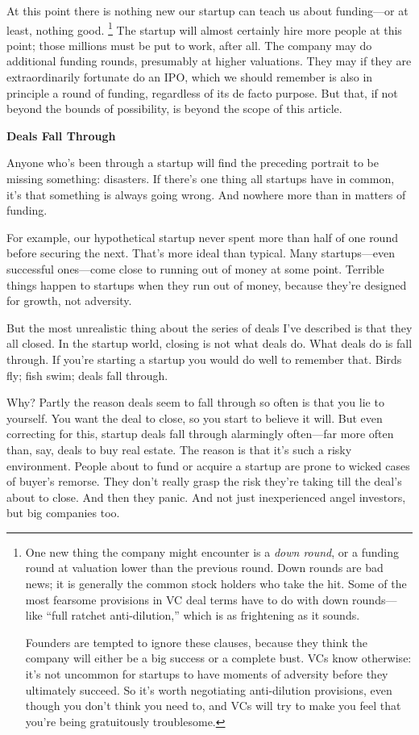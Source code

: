 At this point there is nothing new our startup can teach us about
funding---or at least, nothing good. \footnote{One new thing the company might encounter is a \emph{down
round}, or a funding round at valuation lower than the previous round.
Down rounds are bad news; it is generally the common stock holders who
take the hit. Some of the most fearsome provisions in VC deal terms have
to do with down rounds---like ``full ratchet anti-dilution,'' which is
as frightening as it sounds.

Founders are tempted to ignore these clauses, because they think the
company will either be a big success or a complete bust. VCs know
otherwise: it's not uncommon for startups to have moments of adversity
before they ultimately succeed. So it's worth negotiating anti-dilution
provisions, even though you don't think you need to, and VCs will try to
make you feel that you're being gratuitously troublesome.} The
startup will almost certainly hire more people at this point; those
millions must be put to work, after all. The company may do additional
funding rounds, presumably at higher valuations. They may if they are
extraordinarily fortunate do an IPO, which we should remember is also in
principle a round of funding, regardless of its de facto purpose. But
that, if not beyond the bounds of possibility, is beyond the scope of
this article.

\textbf{Deals Fall Through}

Anyone who's been through a startup will find the preceding portrait to
be missing something: disasters. If there's one thing all startups have
in common, it's that something is always going wrong. And nowhere more
than in matters of funding.

For example, our hypothetical startup never spent more than half of one
round before securing the next. That's more ideal than typical. Many
startups---even successful ones---come close to running out of money at
some point. Terrible things happen to startups when they run out of
money, because they're designed for growth, not adversity.

But the most unrealistic thing about the series of deals I've described
is that they all closed. In the startup world, closing is not what deals
do. What deals do is fall through. If you're starting a startup you
would do well to remember that. Birds fly; fish swim; deals fall
through.

Why? Partly the reason deals seem to fall through so often is that you
lie to yourself. You want the deal to close, so you start to believe it
will. But even correcting for this, startup deals fall through
alarmingly often---far more often than, say, deals to buy real estate.
The reason is that it's such a risky environment. People about to fund
or acquire a startup are prone to wicked cases of buyer's remorse. They
don't really grasp the risk they're taking till the deal's about to
close. And then they panic. And not just inexperienced angel investors,
but big companies too.

